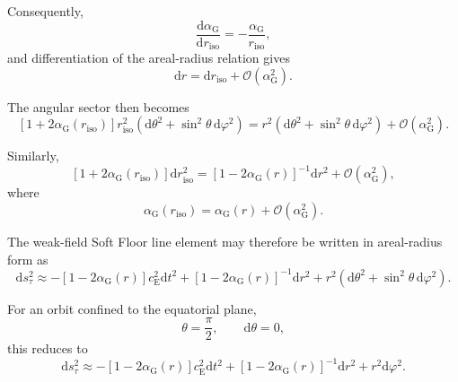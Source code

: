 Consequently,
\begin{equation}
    \frac{\mathrm{d}\alpha_{\mathrm{G}}}{\mathrm{d}r_{\mathrm{iso}}} = -\frac{\alpha_{\mathrm{G}}}{r_{\mathrm{iso}}},
\end{equation}
and differentiation of the areal-radius relation gives
\begin{equation}
    \mathrm{d}r = \mathrm{d}r_{\mathrm{iso}} + \mathcal{O}(\alpha_{\mathrm{G}}^2).
\end{equation}

The angular sector then becomes
\begin{equation}
    \left[ 1+2\alpha_{\mathrm{G}}(r_{\mathrm{iso}}) \right] r_{\mathrm{iso}}^2 \left( \mathrm{d}\theta^2 + \sin^2\theta \, \mathrm{d}\varphi^2 \right) = r^2 \left( \mathrm{d}\theta^2 + \sin^2\theta \, \mathrm{d}\varphi^2 \right) + \mathcal{O}(\alpha_{\mathrm{G}}^2).
\end{equation}

Similarly,
\begin{equation}
    \left[ 1+2\alpha_{\mathrm{G}}(r_{\mathrm{iso}}) \right] \mathrm{d}r_{\mathrm{iso}}^2 = \left[ 1-2\alpha_{\mathrm{G}}(r) \right]^{-1} \mathrm{d}r^2 + \mathcal{O}(\alpha_{\mathrm{G}}^2),
\end{equation}
where
\begin{equation}
    \alpha_{\mathrm{G}}(r_{\mathrm{iso}}) = \alpha_{\mathrm{G}}(r) + \mathcal{O}(\alpha_{\mathrm{G}}^2).
\end{equation}

The weak-field Soft Floor line element may therefore be written in areal-radius form as
\begin{equation}
    \mathrm{d}s_\tau^2 \approx - \left[ 1-2\alpha_{\mathrm{G}}(r) \right] c_{\mathrm{E}}^2\mathrm{d}t^2 + \left[ 1-2\alpha_{\mathrm{G}}(r) \right]^{-1} \mathrm{d}r^2 + r^2 \left( \mathrm{d}\theta^2 + \sin^2\theta \, \mathrm{d}\varphi^2 \right).
\end{equation}

For an orbit confined to the equatorial plane,
\begin{equation}
    \theta = \frac{\pi}{2}, \qquad \mathrm{d}\theta = 0,
\end{equation}
this reduces to
\begin{equation}
    \mathrm{d}s_\tau^2 \approx - \left[ 1-2\alpha_{\mathrm{G}}(r) \right] c_{\mathrm{E}}^2\mathrm{d}t^2 + \left[ 1-2\alpha_{\mathrm{G}}(r) \right]^{-1} \mathrm{d}r^2 + r^2\mathrm{d}\varphi^2.
\end{equation}

